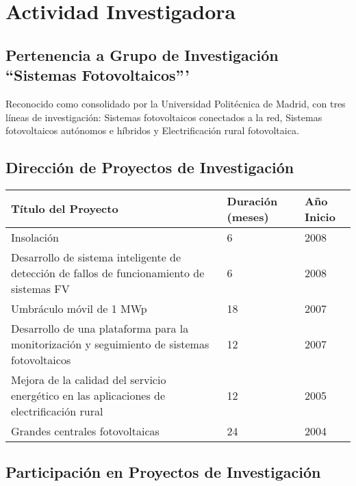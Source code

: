 \documentclass[article, a4paper]{memoir}
\begin{document}
\section{Actividad Investigadora}
\label{sec-4}

\subsection{Pertenencia a Grupo de Investigación ``Sistemas Fotovoltaicos'''}
\label{sec-4-1}

Reconocido como consolidado por la Universidad Politécnica de
Madrid, con tres líneas de investigación: Sistemas fotovoltaicos
conectados a la red, Sistemas fotovoltaicos autónomos e híbridos y
Electrificación rural fotovoltaica.

\subsection{Dirección de Proyectos de Investigación}
\label{sec-4-2}
\begin{center}
\begin{tabular}{p{110mm}|p{17mm}|p{25mm}}
Título del Proyecto & Duración (meses) & Año Inicio\\
\hline
Insolación & 6 & 2008\\
Desarrollo de sistema inteligente de detección de fallos de funcionamiento de sistemas FV & 6 & 2008\\
Umbráculo móvil de 1 MWp & 18 & 2007\\
Desarrollo de una plataforma para la monitorización y seguimiento de sistemas fotovoltaicos & 12 & 2007\\
Mejora de la calidad del servicio energético en las aplicaciones de electrificación rural & 12 & 2005\\
Grandes centrales fotovoltaicas & 24 & 2004\\
\end{tabular}
\end{center}

\subsection{Participación en Proyectos de Investigación}
\label{sec-4-3}
\end{document}
